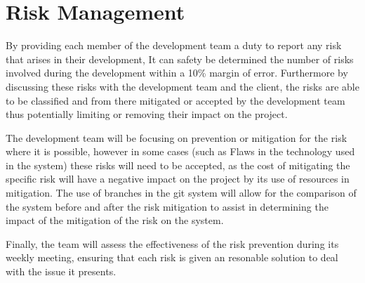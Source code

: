 
\chapter{Risk Management} %

\label{Part4Chapter3} %


By providing each member of the development team a duty to report any risk that arises in their development, It can safety be determined the number of risks involved during the development within a 10\% margin of error. Furthermore by discussing these risks with the development team and the client, the risks are able to be classified and from there mitigated or accepted by the development team thus potentially limiting or removing their impact on the project.

The development team will be focusing on prevention or mitigation for the risk where it is possible, however in some cases (such as Flaws in the technology used in the system) these risks will need to be accepted, as the cost of mitigating the specific risk will have a negative impact on the project by its use of resources in mitigation. The use of branches in the git system will allow for the comparison of the system before and after the risk mitigation to assist in determining the impact of the mitigation of the risk on the system.

Finally, the team will assess the effectiveness of the risk prevention during its weekly meeting, ensuring that each risk is given an resonable solution to deal with the issue it presents.  

